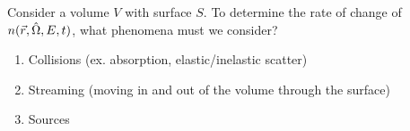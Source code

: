Consider a volume $V$ with surface $S$.
To determine the rate of change of $n(\vec{r},\hat{\Omega},E,t)$, what phenomena must we consider?
\begin{enumerate}
  \item Collisions (ex. absorption, elastic/inelastic scatter)
  \item Streaming (moving in and out of the volume through the surface)
  \item Sources
\end{enumerate}